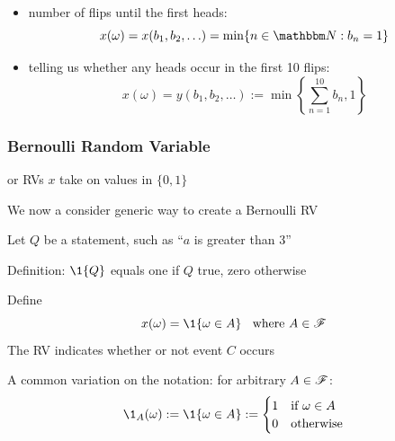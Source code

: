 \begin{frame}

    \vspace{2em}
    \begin{itemize}
        \item number of flips until the first heads:
        \begin{equation*}
            x(\omega) = x(b_1, b_2, \ldots) = \min \setntn{n \in \NN}{b_n = 1}
        \end{equation*}
        
        \item {} telling us whether 
        any heads occur in the first 10 flips:
        \begin{equation}
            \label{eq:egbin}
            x(\omega) = y(b_1, b_2, \ldots) 
            := \min \left\{ \sum_{n=1}^{10} b_n , 1 \right\}
        \end{equation}
    
        \end{itemize}
        
        
\end{frame}


\begin{frame}\frametitle{Bernoulli Random Variable}

    \vspace{2em}
     or  RVs $x$ take on values in $\{0,1\}$ 
    
    We now a consider generic way to create a Bernoulli RV
    
    Let $Q$ be a statement, such as ``$a$ is greater than 3'' 

    Definition: $\1\{Q\}$ equals one if $Q$ true, zero otherwise
\end{frame}

\begin{frame}

    \vspace{2em}
    Define 
    \begin{equation*}
        x(\omega) = \1\{\omega \in A\}
        \;\;
        \text{ where } A \in \fF
    \end{equation*}
    The RV indicates whether or not event $C$ occurs  
    
    A common variation on
    the notation: for arbitrary $A \in \mathscr F$:
    \begin{equation*}
        \1_A(\omega) 
        := \1\{\omega \in A\} 
        := 
        \begin{cases}
            1 & \text{if } \omega \in A
            \\
            0 & \text{otherwise}
        \end{cases}
    \end{equation*}
    
\end{frame}

